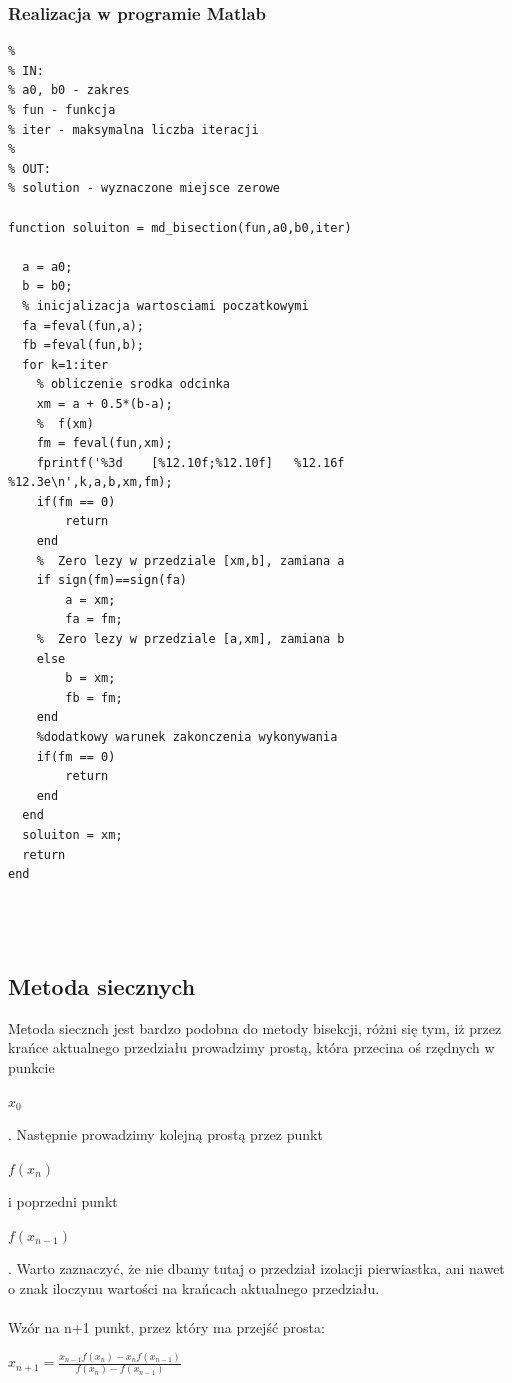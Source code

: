 \documentclass[11pt, oneside]{article}   	%
\begin{document}
\subsubsection{Realizacja w programie Matlab}
\begin{lstlisting}[caption=Implementacja metody bisekcji]
% Funkcja wyznaczajaca punkty zerowe funkcji metoda bisekcji
%
% IN:
% a0, b0 - zakres
% fun - funkcja 
% iter - maksymalna liczba iteracji
%
% OUT:
% solution - wyznaczone miejsce zerowe

function soluiton = md_bisection(fun,a0,b0,iter)

  a = a0; 
  b = b0;
  % inicjalizacja wartosciami poczatkowymi
  fa =feval(fun,a);     
  fb =feval(fun,b);
  for k=1:iter
    % obliczenie srodka odcinka
    xm = a + 0.5*(b-a);    
    %  f(xm) 
    fm = feval(fun,xm);      
    fprintf('%3d    [%12.10f;%12.10f]	%12.16f     %12.3e\n',k,a,b,xm,fm);
    if(fm == 0)
        return
    end
    %  Zero lezy w przedziale [xm,b], zamiana a
    if sign(fm)==sign(fa)    
        a = xm;
        fa = fm;
    %  Zero lezy w przedziale [a,xm], zamiana b
    else                     
        b = xm;
        fb = fm;
    end
    %dodatkowy warunek zakonczenia wykonywania
    if(fm == 0) 
        return
    end
  end
  soluiton = xm; 
  return
end
	

		
\end{lstlisting}


\subsection{Metoda siecznych}
Metoda siecznch jest bardzo podobna do metody bisekcji, różni się tym, iż przez krańce aktualnego przedziału prowadzimy prostą, która przecina oś rzędnych w punkcie \begin{large}
$x_{0}$
\end{large}. Następnie prowadzimy kolejną prostą przez punkt \begin{large}
$f(x_{n})$ 
\end{large} i poprzedni punkt \begin{large}
$f(x_{n-1})$ 
\end{large}. Warto zaznaczyć, że nie dbamy tutaj o przedział izolacji pierwiastka, ani nawet o znak iloczynu wartości na krańcach aktualnego przedziału.\\\\
Wzór na n+1 punkt, przez który ma przejść prosta:
\begin{large}
$x_{n+1}=\frac{x_{n-1}f(x_{n})-x_{n}f(x_{n-1})}{f(x_{n})-f(x_{n-1})}$
\end{large}
\end{document}
